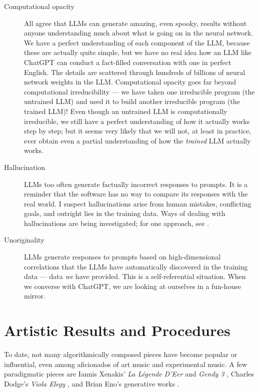 \documentclass[]{interact}
\theoremstyle{plain}%
\theoremstyle{definition}
\theoremstyle{remark}
\begin{document}
\begin{description}
\item[Computational opacity] All agree that LLMs can generate amazing, even spooky, results without anyone understanding much about what is going on in the neural network. We have a perfect understanding of each component of the LLM, because these are actually quite simple, but we have no real idea how an LLM like ChatGPT can conduct a fact-filled conversation with one in perfect English. The details are scattered through hundreds of billions of neural network weights in the LLM. Computational opacity goes far beyond computational irreducibility --- we have taken one irreducible program (the untrained LLM) and used it to build another irreducible program (the trained LLM)! Even though an untrained LLM is computationally irreducible, we still have a perfect understanding of how it actually works step by step; but it seems very likely that we will not, at least in practice, ever obtain even a partial understanding of how the \emph{trained} LLM actually works.
\item [Hallucination] LLMs too often generate factually incorrect responses to prompts. It is a reminder that the software has no way to compare its responses with the real world. I suspect hallucinations arise from human mistakes, conflicting goals, and outright lies in the training data. Ways of dealing with hallucinations are being investigated; for one approach, see \citep{christiano2017deep}.
\item [Unoriginality] LLMs generate responses to prompts based on high-dimensional correlations that the LLMs have automatically discovered in the training data --- data \emph{we} have provided. This is a self-referential situation. When we converse with ChatGPT, we are looking at ourselves in a fun-house mirror.
\end{description}

\section{Artistic Results and Procedures}

To date, not many algorithmically composed pieces have become popular or influential, even among aficionados of art music and experimental music. A few paradigmatic pieces are Iannis Xenakis' \emph{La Légende D'Eer} \citep{Solr-8143160} and \emph{Gendy 3} \citep{gendy3},  Charles Dodge's \emph{Viola Elegy} \citep{violaelegy}, and Brian Eno's generative works \citep{eno1996generative, enochilvers}. 
\end{document}
